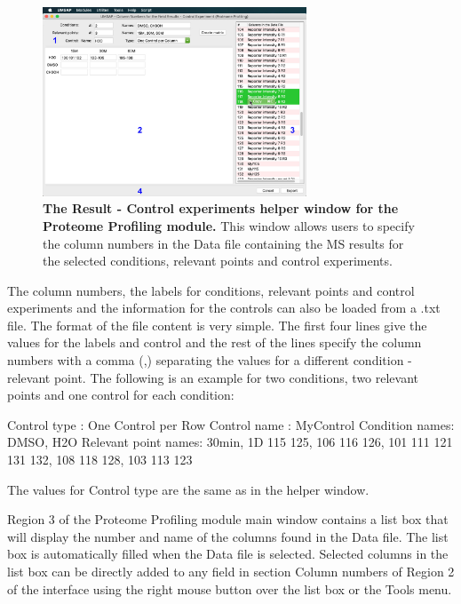 \begin{figure}[h]
	\centering
	\includegraphics[width=0.7\textwidth]{./IMAGES/MOD-PROTPROF/protprof-rescontrol.jpg}
	\caption[The Result - Control experiments helper window for the Proteome Profiling module]{\textbf{The Result - Control experiments helper window for the Proteome Profiling module.} This window allows users to specify the column numbers in the Data file containing the MS results for the selected conditions, relevant points and control experiments.} 
	\label{fig:protprofResControlWindow}
	\vspace{-5pt} 	
\end{figure}

The column numbers, the labels for conditions, relevant points and control experiments and the information for the controls can also be loaded from a .txt file. The format of the file content is very simple. The first four lines give the values for the labels and control and the rest of the lines specify the column numbers with a comma (,) separating the values for a different condition - relevant point. The following is an example for two conditions, two relevant points and one control for each condition:

Control type : One Control per Row\newline
Control name : MyControl\newline
Condition names: DMSO, H2O\newline
Relevant point names: 30min, 1D\newline
{} 115 125, 106 116 126, 101 111 121   131 132, 108 118 128, 103 113 123\newline

The values for Control type are the same as in the helper window.

Region \num{3} of the Proteome Profiling module main window contains a list box that will display the number and name of the columns found in the Data file. The list box is automatically filled when the Data file is selected. Selected columns in the list box can be directly added to any field in section Column numbers of Region \num{2} of the interface using the right mouse button over the list box or the Tools menu.


